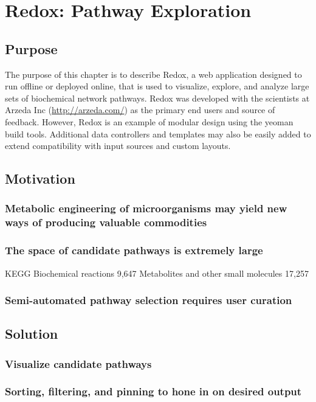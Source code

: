 \chapter{Redox: Pathway Exploration}
\label{chap:redox}

\section{Purpose}
The purpose of this chapter is to describe Redox, a web application designed to run offline or deployed online, that is used to visualize, explore, and analyze large sets of biochemical network pathways.
Redox was developed with the scientists at Arzeda Inc (\url{http://arzeda.com/}) as the primary end users and source of feedback.
However, Redox is an example of modular design using the yeoman build tools.
Additional data controllers and templates may also be easily added to extend compatibility with input sources and custom layouts.

\section{Motivation}
\subsection{Metabolic engineering of microorganisms may yield new ways of producing valuable commodities}
\subsection{The space of candidate pathways is extremely large}
KEGG
Biochemical reactions 9,647
Metabolites and other small molecules 17,257
\subsection{Semi-automated pathway selection requires user curation}


\section{Solution}
\subsection{Visualize candidate pathways}
\subsection{Sorting, filtering, and pinning to hone in on desired output}
